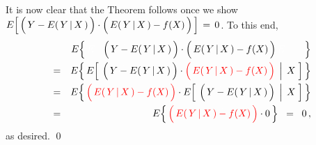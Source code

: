 It is now clear that the Theorem follows once we show
$E\!\left[\,
	\left(\,Y \overset{{\color{white}.}}{-} E(\,Y\,\vert\,X\,)\,\right)
	\cdot
	\left(\,E(\,Y\,\vert\,X\,) \overset{{\color{white}.}}{-} f(X)\,\right)
	\,\right] \,=\, 0$.
To this end,
\begin{eqnarray*}
&&
	E\!\left\{\,
	{\color{white}E\;\;\,}
	\left(\,Y \overset{{\color{white}.}}{-} E(\,Y\,\vert\,X\,)\,\right)
	\cdot
	\left(\,E(\,Y\,\vert\,X\,) \overset{{\color{white}.}}{-} f(X)\,\right)
	{\color{white}E\quad\;\;\;}
	\,\right\}
\\
&=&
	E\!\left\{\,
	E\!\left[\;
		\left.
		\left(\,Y \overset{{\color{white}.}}{-} E(\,Y\,\vert\,X\,)\,\right)
		\cdot
		{\color{red}\left(\,E(\,Y\,\vert\,X\,) \overset{{\color{white}.}}{-} f(X)\,\right)}
		\;\,\right\vert\;X
	\;\right]
	\,\right\}
\\
&=&
	E\!\left\{\,
	{\color{red}\left(\,E(\,Y\,\vert\,X\,) \overset{{\color{white}.}}{-} f(X)\,\right)}
	\cdot
	E\!\left[\;
		\left.
		\left(\,Y \overset{{\color{white}.}}{-} E(\,Y\,\vert\,X\,)\,\right)		
		\;\,\right\vert\;X
	\;\right]
	\,\right\}
\\
&=&
	E\!\left\{\,
	{\color{red}\left(\,E(\,Y\,\vert\,X\,) \overset{{\color{white}.}}{-} f(X)\,\right)}
	\cdot 0
	\,\right\}
	\;\; = \;\; 0\,,
\end{eqnarray*}
as desired.
\qed


